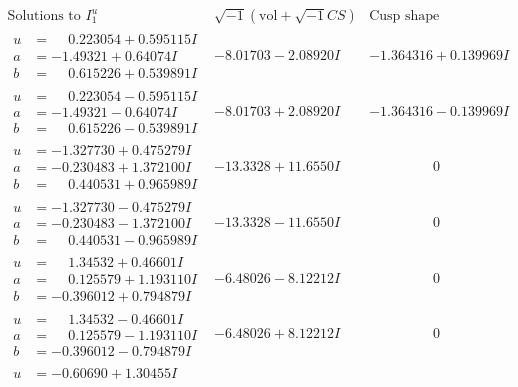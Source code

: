 \documentclass[1p]{elsarticle_modified}
\theoremstyle{definition}
\newcommand{\I}{\sqrt{-1}}
\begin{document}
$$\begin{array}{c|c|c}
\text{Solutions to }I^u_{1}& \I (\text{vol} + \sqrt{-1}CS) & \text{Cusp shape}\\
 \hline 
\begin{aligned}
u &= \phantom{-}0.223054 + 0.595115 I \\
a &= -1.49321 + 0.64074 I \\
b &= \phantom{-}0.615226 + 0.539891 I\end{aligned}
 & -8.01703 - 2.08920 I & -1.364316 + 0.139969 I \\ \hline\begin{aligned}
u &= \phantom{-}0.223054 - 0.595115 I \\
a &= -1.49321 - 0.64074 I \\
b &= \phantom{-}0.615226 - 0.539891 I\end{aligned}
 & -8.01703 + 2.08920 I & -1.364316 - 0.139969 I \\ \hline\begin{aligned}
u &= -1.327730 + 0.475279 I \\
a &= -0.230483 + 1.372100 I \\
b &= \phantom{-}0.440531 + 0.965989 I\end{aligned}
 & -13.3328 + 11.6550 I & \phantom{-0.000000 } 0 \\ \hline\begin{aligned}
u &= -1.327730 - 0.475279 I \\
a &= -0.230483 - 1.372100 I \\
b &= \phantom{-}0.440531 - 0.965989 I\end{aligned}
 & -13.3328 - 11.6550 I & \phantom{-0.000000 } 0 \\ \hline\begin{aligned}
u &= \phantom{-}1.34532 + 0.46601 I \\
a &= \phantom{-}0.125579 + 1.193110 I \\
b &= -0.396012 + 0.794879 I\end{aligned}
 & -6.48026 - 8.12212 I & \phantom{-0.000000 } 0 \\ \hline\begin{aligned}
u &= \phantom{-}1.34532 - 0.46601 I \\
a &= \phantom{-}0.125579 - 1.193110 I \\
b &= -0.396012 - 0.794879 I\end{aligned}
 & -6.48026 + 8.12212 I & \phantom{-0.000000 } 0 \\ \hline\begin{aligned}
u &= -0.60690 + 1.30455 I \\

\end{aligned}
\end{array}$$
\end{document}
